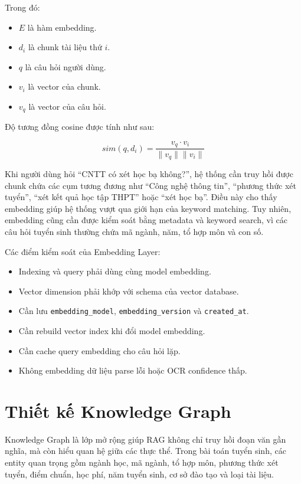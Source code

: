 \documentclass[12pt,a4paper]{report}
\begin{document}
Trong đó:

\begin{itemize}
    \item $E$ là hàm embedding.
    \item $d_i$ là chunk tài liệu thứ $i$.
    \item $q$ là câu hỏi người dùng.
    \item $v_i$ là vector của chunk.
    \item $v_q$ là vector của câu hỏi.
\end{itemize}

Độ tương đồng cosine được tính như sau:

\begin{equation}
sim(q, d_i) = \frac{v_q \cdot v_i}{\|v_q\| \|v_i\|}
\end{equation}

Khi người dùng hỏi ``CNTT có xét học bạ không?'', hệ thống cần truy hồi được chunk chứa các cụm tương đương như ``Công nghệ thông tin'', ``phương thức xét tuyển'', ``xét kết quả học tập THPT'' hoặc ``xét học bạ''. Điều này cho thấy embedding giúp hệ thống vượt qua giới hạn của keyword matching. Tuy nhiên, embedding cũng cần được kiểm soát bằng metadata và keyword search, vì các câu hỏi tuyển sinh thường chứa mã ngành, năm, tổ hợp môn và con số.

Các điểm kiểm soát của Embedding Layer:

\begin{itemize}
    \item Indexing và query phải dùng cùng model embedding.
    \item Vector dimension phải khớp với schema của vector database.
    \item Cần lưu \texttt{embedding\_model}, \texttt{embedding\_version} và \texttt{created\_at}.
    \item Cần rebuild vector index khi đổi model embedding.
    \item Cần cache query embedding cho câu hỏi lặp.
    \item Không embedding dữ liệu parse lỗi hoặc OCR confidence thấp.
\end{itemize}

\section{Thiết kế Knowledge Graph}

Knowledge Graph là lớp mở rộng giúp RAG không chỉ truy hồi đoạn văn gần nghĩa, mà còn hiểu quan hệ giữa các thực thể. Trong bài toán tuyển sinh, các entity quan trọng gồm ngành học, mã ngành, tổ hợp môn, phương thức xét tuyển, điểm chuẩn, học phí, năm tuyển sinh, cơ sở đào tạo và loại tài liệu.
\end{document}
